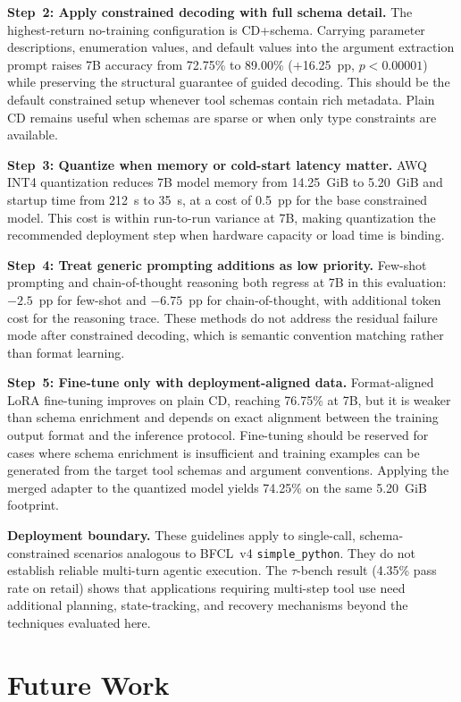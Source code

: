\textbf{Step~2: Apply constrained decoding with full schema detail.}
The highest-return no-training configuration is CD+schema. Carrying parameter
descriptions, enumeration values, and default values into the argument
extraction prompt raises 7B accuracy from 72.75\% to 89.00\% ($+$16.25~pp,
$p < 0.00001$) while preserving the structural guarantee of guided decoding.
This should be the default constrained setup whenever tool schemas contain rich
metadata. Plain CD remains useful when schemas are sparse or when only type
constraints are available.

\textbf{Step~3: Quantize when memory or cold-start latency matter.}
AWQ INT4 quantization reduces 7B model memory from 14.25~GiB to 5.20~GiB and
startup time from 212~s to 35~s, at a cost of 0.5~pp for the base constrained
model. This cost is within run-to-run variance at 7B, making quantization the
recommended deployment step when hardware capacity or load time is binding.

\textbf{Step~4: Treat generic prompting additions as low priority.}
Few-shot prompting and chain-of-thought reasoning both regress at 7B in this
evaluation: $-2.5$~pp for few-shot and $-6.75$~pp for chain-of-thought, with
additional token cost for the reasoning trace. These methods do not address the
residual failure mode after constrained decoding, which is semantic convention
matching rather than format learning.

\textbf{Step~5: Fine-tune only with deployment-aligned data.}
Format-aligned LoRA fine-tuning improves on plain CD, reaching 76.75\% at 7B,
but it is weaker than schema enrichment and depends on exact alignment between
the training output format and the inference protocol. Fine-tuning should be
reserved for cases where schema enrichment is insufficient and training examples
can be generated from the target tool schemas and argument conventions. Applying
the merged adapter to the quantized model yields 74.25\% on the same 5.20~GiB
footprint.

\textbf{Deployment boundary.}
These guidelines apply to single-call, schema-constrained scenarios analogous
to BFCL~v4 \texttt{simple\_python}. They do not establish reliable multi-turn
agentic execution. The $\tau$-bench result (4.35\% pass rate on retail) shows
that applications requiring multi-step tool use need additional planning,
state-tracking, and recovery mechanisms beyond the techniques evaluated here.

\section{Future Work} \label{sec:future-work}


